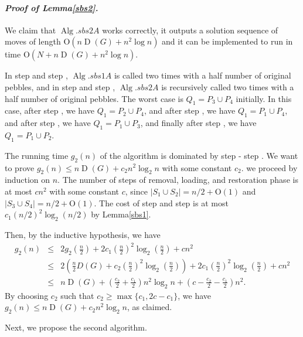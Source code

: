 \documentclass[letter,11pt]{article}
\newcommand{\white}{\qquad{\framebox{\rule{0pt}{4pt}}}}
\newcommand{\owari}{\hfill\white}
\theoremstyle{definition}
\theoremstyle{definition}
\DeclareMathOperator{\Alg}{Alg}
\DeclareMathOperator{\D}{D}
\newcommand{\1}{\boldmath$~1~$\unboldmath}
\newcommand{\Ord}{\mathrm{O}}
\newcommand{\qedgo}{\vspace{0.35cm}}
\newcommand{\tume}{\hspace*{0.2em}}
\newcommand{\maru}[1]{{\ooalign{\hfill$\small#1$\hfill\crcr\scalebox{1.3}{$\bigcirc$}}}}
\newenvironment{Proofof}[1]{\expandafter
\paragraph{{\it Proof of #1.}}}{\hspace{5mm}\owari\qedgo}
\begin{document}
\begin{Proofof}{Lemma\tume\ref{sbs2}}
We claim that $\Alg.sbs2A$ works correctly, it outputs a solution sequence of moves of length $\Ord (n\D(G) + n^2 \log n) $ and it can be implemented to run in time $\Ord (N + n\D(G) + n^2 \log n)$.

In step \maru{4} and step \maru{5}, $\Alg.sbs1A$ is called two times with a half number of original pebbles, and 
in step \maru{3} and step \maru{6}, $\Alg.sbs2A$ is recursively called two times with a half number of original pebbles.
The worst case is $Q_1 = P_3 \cup P_4$ initially.
In this case, after step \maru{3}, we have $Q_1 = P_2 \cup P_4$, and after step \maru{4}, we have $Q_1 = P_1 \cup P_4$, and after step \maru{5}, we have $Q_1 = P_1 \cup P_3$, and finally after step \maru{6}, we have $Q_1 = P_1 \cup P_2$.

The running time $g_2(n)$ of the algorithm is dominated by step \maru{3} - step \maru{6}.
We want to prove $g_2(n) \le n\D(G) + c_2 n^2 \log_2 n$ with some constant $c_2$.
we proceed by induction on $n$.
The number of steps of removal, loading, and restoration phase is at most $cn^2$ with some constant $c$, since $|S_1 \cup S_2| = n/2 + \Ord (1)$ and $|S_3 \cup S_4| = n/2 + \Ord (1)$.
The cost of step \maru{4} and step \maru{5} is at most $c_1 (n/2)^2 \log_2 (n/2)$ by Lemma\tume\ref{sbs1}.

Then, by the inductive hypothesis, we have
\begin{eqnarray*}
g_2(n) & \le & 2 g_2(\frac{n}{2}) + 2c_1 (\frac{n}{2})^2 \log_2 (\frac{n}{2}) + c n^2 \\
 & \le & 2 ( \frac{n}{2}D(G) + c_2 (\frac{n}{2})^2 \log_2 (\frac{n}{2}) ) + 2c_1 (\frac{n}{2})^2 \log_2 (\frac{n}{2}) + c n^2 \\
 & \le & n\D(G) + (\frac{c_2}{2} + \frac{c_1}{2}) n^2 \log_2 n + (c - \frac{c_2}{2} - \frac{c_1}{2} )n^2.
\end{eqnarray*} 
By choosing $c_2$ such that $c_2 \ge \max \{ c_1, 2c - c_1 \}$, we have $g_2(n) \le n\D(G) + c_2 n^2 \log_2 n$, as claimed.              

Next, we propose the second algorithm. 


\end{Proofof}
\end{document}
